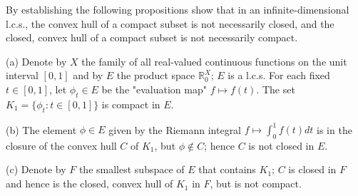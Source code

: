 By establishing the following propositions show that in an infinite-dimensional l.c.s., the convex hull of a compact subset is not necessarily closed, and the closed, convex hull of a compact subset is not necessarily compact.

(a) Denote by $X$ the family of all real-valued continuous functions on the unit interval $[0, 1]$ and by $E$ the product space $\mathbb{R}_0^X$; $E$ is a l.c.s. For each fixed $t \in [0, 1]$, let $\phi_t \in E$ be the "evaluation map" $f \mapsto f(t)$. The set $K_1 = \{ \phi_t : t \in [0, 1] \}$ is compact in $E$.

(b) The element $\phi \in E$ given by the Riemann integral $f \mapsto \int_0^1 f(t) dt$ is in the closure of the convex hull $C$ of $K_1$, but $\phi \notin C$; hence $C$ is not closed in $E$.

(c) Denote by $F$ the smallest subspace of $E$ that contains $K_1$; $C$ is closed in $F$ and hence is the closed, convex hull of $K_1$ in $F$, but is not compact.
